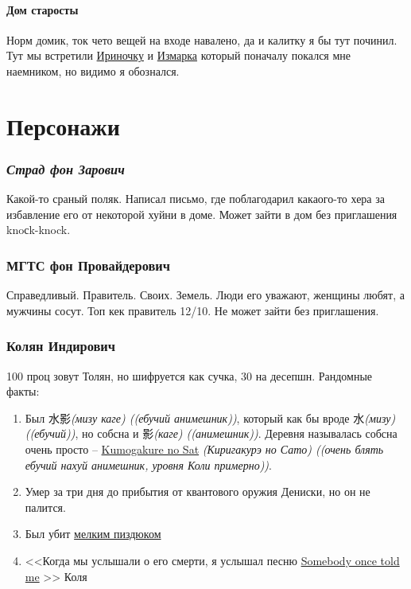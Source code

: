 \documentclass[letterpaper,twocolumn,openany,nodeprecatedcode]{dndbook}
\begin{document}
\subsection{Дом старосты}\label{sec:vilage:homie}
Норм домик, ток чето вещей на входе навалено, да и калитку я бы тут починил. Тут мы встретили \hyperref[sec:irina_kolyana]{Ириночку} и \hyperref[sec:ismark_kolyanovich]{Измарка} 
который поначалу покался мне наемником, но видимо я обознался.

\part{Персонажи}

\section{\textit{Страд фон Зарович}}

Какой-то сраный поляк. Написал письмо, где поблагодарил какаого-то хера за избавление его от некоторой хуйни в доме. Может зайти в дом без приглашения \textenglish{knoсk-knock}.

\section{МГТС фон Провайдерович}

Справедливый. Правитель. Своих. Земель. Люди его уважают, женщины любят, а мужчины сосут. Топ кек правитель 12/10. Не может зайти без приглашения.

\section{Колян Индирович}\label{sec:kolyan_indirovich}

100 проц зовут Толян, но шифруется как сучка, 30 на десепшн. Рандомные факты:

\begin{enumerate}
    \item Был 水影{\it(мизу каге) ((ебучий анимешник))}, который как бы вроде 水{\it (мизу) ((ебучий))}, но собсна и 影{\it (каге) ((анимешник))}. Деревня называлась собсна очень просто -- \href{sec:vilage}{Kumogakure no Sat} {\it (Киригакурэ но Сато) ((очень блять ебучий нахуй анимешник, уровня Коли примерно))}.
    \item Умер за три дня до прибытия от квантового оружия {Дениски}, но он не палится.
    \item Был убит \hyperref[sec:kolyan_indirovich]{мелким пиздюком}
    \item <<Когда мы услышали о его смерти, я услышал песню \href{https://www.youtube.com/watch?v=L_jWHffIx5E}{Somebody once told me} >> \textcopyright Коля
\end{enumerate}
\end{document}
